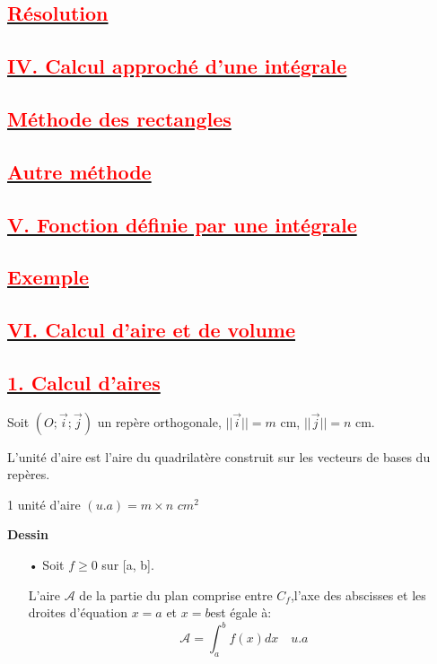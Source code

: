 \documentclass[12pt]{article}
\begin{document}
\subsection*{\underline{\textbf{\textcolor{red}{Résolution}}}}
\subsection*{\underline{\textbf{\textcolor{red}{IV. Calcul approché d'une intégrale}}}}
\subsection*{\underline{\textbf{\textcolor{red}{Méthode des rectangles}}}}
\subsection*{\underline{\textbf{\textcolor{red}{Autre méthode}}}}
\subsection*{\underline{\textbf{\textcolor{red}{V. Fonction définie par une intégrale}}}}
\subsection*{\underline{\textbf{\textcolor{red}{Exemple}}}}
\subsection*{\underline{\textbf{\textcolor{red}{VI. Calcul d'aire et de volume }}}}
\subsection*{\underline{\textbf{\textcolor{red}{1. Calcul d'aires}}}}

Soit $(O ; \vec{i} ; \vec{j})$ un repère orthogonale, $||\vec{i}||=m$ cm, $||\vec{j}||=n$ cm.

L'unité d'aire est l'aire du quadrilatère construit sur les vecteurs de bases du repères.

1 unité d'aire $(u.a)=m\times n$ $cm^{2}$

\textbf{Dessin}
\begin{itemize}
\item[•] Soit $f\geq 0$ sur [a, b].

L'aire $\mathcal{A}$  de la partie du plan comprise entre $C_{f}$,l'axe des abscisses et les droites d'équation $x=a$ et $x=b$est égale à:
\[\mathcal{A}=\int_{a}^{b}f(x)dx\quad u.a\]
\end{itemize}
\end{document}

